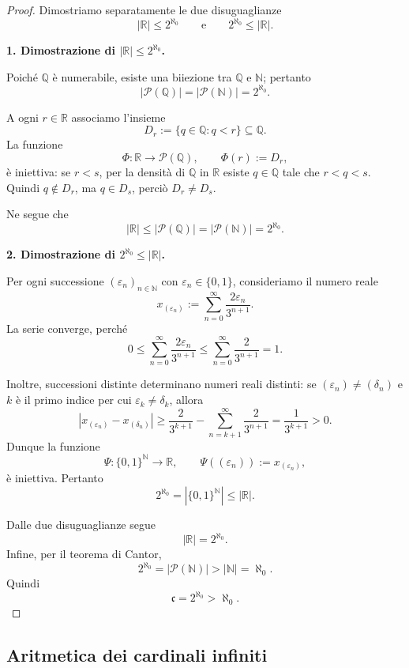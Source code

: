 \documentclass[11pt,a4paper]{article}
\theoremstyle{definition}
\theoremstyle{plain}
\theoremstyle{remark}
\begin{document}
\begin{proof}
Dimostriamo separatamente le due disuguaglianze
\[
|\mathbb{R}|\leq 2^{\aleph_0}
\qquad\text{e}\qquad
2^{\aleph_0}\leq|\mathbb{R}|.
\]

\medskip
\noindent
\textbf{1. Dimostrazione di $|\mathbb{R}|\leq 2^{\aleph_0}$.}

Poiché $\mathbb{Q}$ è numerabile, esiste una biiezione
tra $\mathbb{Q}$ e $\mathbb{N}$; pertanto
\[
|\mathcal{P}(\mathbb{Q})|
=
|\mathcal{P}(\mathbb{N})|
=
2^{\aleph_0}.
\]

A ogni $r\in\mathbb{R}$ associamo l'insieme
\[
D_r:=\{q\in\mathbb{Q}:q<r\}\subseteq\mathbb{Q}.
\]
La funzione
\[
\Phi:\mathbb{R}\to\mathcal{P}(\mathbb{Q}),
\qquad
\Phi(r):=D_r,
\]
è iniettiva: se $r<s$, per la densità di $\mathbb{Q}$ in
$\mathbb{R}$ esiste $q\in\mathbb{Q}$ tale che
$r<q<s$. Quindi $q\notin D_r$, ma $q\in D_s$,
perciò $D_r\neq D_s$.

Ne segue che
\[
|\mathbb{R}|
\leq|\mathcal{P}(\mathbb{Q})|
=|\mathcal{P}(\mathbb{N})|
=2^{\aleph_0}.
\]

\medskip
\noindent
\textbf{2. Dimostrazione di $2^{\aleph_0}\leq|\mathbb{R}|$.}

Per ogni successione $(\varepsilon_n)_{n\in\mathbb{N}}$
con $\varepsilon_n\in\{0,1\}$, consideriamo il numero reale
\[
x_{(\varepsilon_n)}
:=
\sum_{n=0}^{\infty}\frac{2\varepsilon_n}{3^{n+1}}.
\]
La serie converge, perché
\[
0\leq
\sum_{n=0}^{\infty}\frac{2\varepsilon_n}{3^{n+1}}
\leq
\sum_{n=0}^{\infty}\frac{2}{3^{n+1}}
=1.
\]

Inoltre, successioni distinte determinano numeri reali
distinti: se $(\varepsilon_n)\neq(\delta_n)$ e $k$ è
il primo indice per cui $\varepsilon_k\neq\delta_k$,
allora
\[
\left|x_{(\varepsilon_n)}-x_{(\delta_n)}\right|
\geq
\frac{2}{3^{k+1}}
-
\sum_{n=k+1}^{\infty}\frac{2}{3^{n+1}}
=
\frac{1}{3^{k+1}}>0.
\]
Dunque la funzione
\[
\Psi:\{0,1\}^{\mathbb{N}}\to\mathbb{R},
\qquad
\Psi((\varepsilon_n)):=x_{(\varepsilon_n)},
\]
è iniettiva. Pertanto
\[
2^{\aleph_0}
=|\{0,1\}^{\mathbb{N}}|
\leq|\mathbb{R}|.
\]

Dalle due disuguaglianze segue
\[
|\mathbb{R}|=2^{\aleph_0}.
\]
Infine, per il teorema di Cantor,
\[
2^{\aleph_0}=|\mathcal{P}(\mathbb{N})|
>|\mathbb{N}|=\aleph_0.
\]
Quindi
\[
{\mathfrak{c}=2^{\aleph_0}>\aleph_0.}
\]
\end{proof}





\subsection{Aritmetica dei cardinali infiniti}
\end{document}

